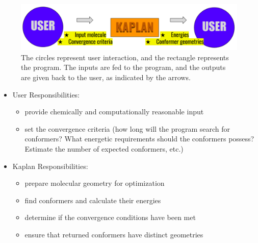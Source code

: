 \documentclass[12pt]{article}
\newcommand{\progname}{Kaplan} %
\begin{document}


\begin{figure}[H]
	\includegraphics[width=\textwidth]{sys-context}
	\caption{The circles represent user interaction, and the rectangle 
	represents the program. The inputs are fed to the program, and the 
	outputs are given back to the user, as indicated by the arrows.}
	\label{sys-context}
\end{figure}

\begin{itemize}
\item User Responsibilities:
\begin{itemize}
\item provide chemically and computationally reasonable input

\item set the convergence criteria (how long will the program search for 
conformers? What energetic requirements should the 
conformers possess? Estimate 
the number of expected conformers, etc.)
\end{itemize}
\item \progname{} Responsibilities:
\begin{itemize}
\item prepare molecular geometry for optimization
\item find conformers and calculate their energies
\item determine if the convergence conditions have been met
\item ensure that returned conformers have distinct geometries 
\end{itemize}
\end{itemize}
\end{document}
